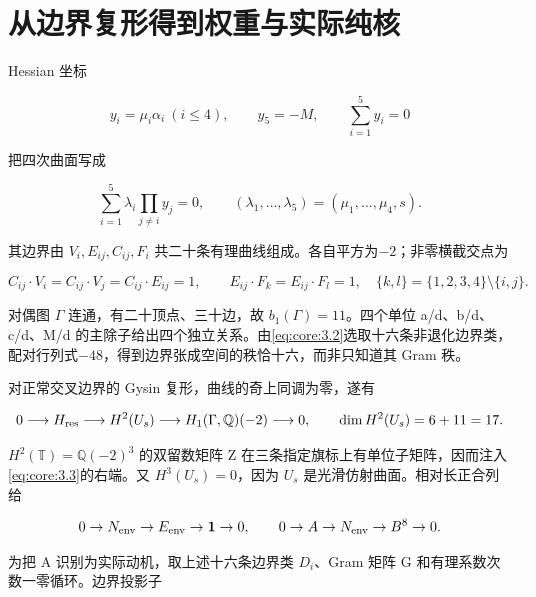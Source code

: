 \documentclass[11pt,a4paper,oneside]{ctexrep}
\theoremstyle{cnplain}
\theoremstyle{definition}
\theoremstyle{remark}
\begin{document}
\section{从边界复形得到权重与实际纯核}\label{sec:core:3}

Hessian 坐标

\begin{equation}
y_i=\mu_i\alpha_i\ (i\leq4),\qquad y_5=-M,\qquad
 \sum_{i=1}^5y_i=0
\end{equation}

把四次曲面写成

\begin{equation}
\sum_{i=1}^5\lambda_i\prod_{j\ne i}y_j=0,
 \qquad (\lambda_1,\ldots,\lambda_5)=(\mu_1,\ldots,\mu_4,s).
                                                               \label{eq:core:3.1}
\end{equation}

其边界由 \(V_i,E_{ij},C_{ij},F_i\) 共二十条有理曲线组成。各自平方为\(- 2\)；非零横截交点为

\begin{equation}
C_{ij}\cdot V_i=C_{ij}\cdot V_j=C_{ij}\cdot E_{ij}=1,
 \qquad E_{ij}\cdot F_k=E_{ij}\cdot F_l=1,
 \quad\{k,l\}=\{1,2,3,4\}\setminus\{i,j\}.             \label{eq:core:3.2}
\end{equation}

对偶图 \(\Gamma \) 连通，有二十顶点、三十边，故 \(b_1(\Gamma)=11\)。四个单位 a/d、b/d、c/d、M/d 的主除子给出四个独立关系。由\eqref{eq:core:3.2}选取十六条非退化边界类，配对行列式\(- 48\)，得到边界张成空间的秩恰十六，而非只知道其 Gram 秩。

对正常交叉边界的 Gysin 复形，曲线的奇上同调为零，遂有

\begin{equation}
0\longrightarrow H_{\rm res}\longrightarrow H^2(U_s)
 \longrightarrow H_1(\Gamma,\mathbb Q)(-2)\longrightarrow0,
 \qquad \dim H^2(U_s)=6+11=17.                          \label{eq:core:3.3}
\end{equation}

\(H^2(\mathbb T)=\mathbb Q(-2)^3\) 的双留数矩阵 Z 在三条指定旗标上有单位子矩阵，因而注入\eqref{eq:core:3.3}的右端。又 \(H^3(U_s)=0\)，因为 \(U_s\) 是光滑仿射曲面。相对长正合列给

\begin{equation}
0\to N_{\rm env}\to E_{\rm env}\to\mathbf1\to0,
 \qquad 0\to A\to N_{\rm env}\to B^8\to0.              \label{eq:core:3.4}
\end{equation}

为把 A 识别为实际动机，取上述十六条边界类 \(D_i\)、Gram 矩阵 G 和有理系数次数一零循环。边界投影子
\end{document}
